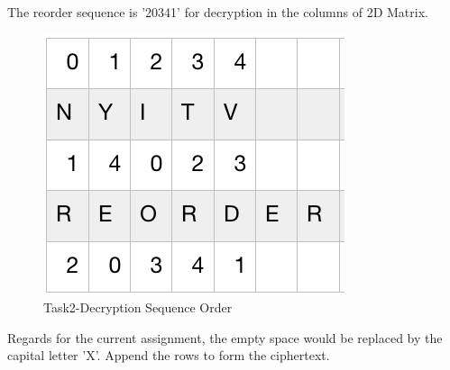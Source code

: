 \documentclass[twoside,twocolumn]{article}
\begin{document}
The reorder sequence is '20341' for decryption in the columns of 2D Matrix. \\

\begin{figure}[H]
  \centering
  \includegraphics[scale=0.45]{./Graphs/Figure1.5.png}
  \caption{Task2-Decryption Sequence Order}
  \label{fig:testfig1}
\end{figure}


Regards for the current assignment, the empty space would be replaced by the capital letter 'X'.  Append the rows to form the ciphertext.\\
\end{document}
